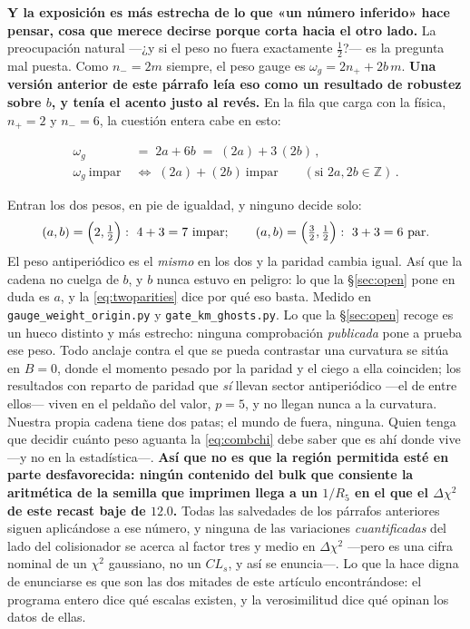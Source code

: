 \documentclass[11pt,a4paper]{article}
\newcommand{\ZZ}{\mathbb{Z}}
\newenvironment{keyeq}
  {\begin{center}\setlength{\fboxsep}{9pt}\setlength{\fboxrule}{0.8pt}%
   \begin{lrbox}{\keyeqbox}\begin{minipage}{0.88\textwidth}}
  {\end{minipage}\end{lrbox}%
   \fcolorbox{hdrblue!55}{hdrblue!6}{\usebox{\keyeqbox}}\end{center}}
\begin{document}
\noindent \textbf{Y la exposición es más estrecha de lo que «un número inferido» hace pensar, cosa
que merece decirse porque corta hacia el otro lado.} La preocupación natural ---¿y si el peso no
fuera exactamente $\tfrac12$?--- es la pregunta mal puesta. Como $n_-=2m$ siempre, el peso gauge es
$\omega_g=2n_++2b\,m$. \textbf{Una versión anterior de este párrafo leía eso como un resultado de
robustez sobre $b$, y tenía el acento justo al revés.} En la fila que carga con la física, $n_+=2$
y $n_-=6$, la cuestión entera cabe en esto:
\begin{keyeq}
\begin{equation}\label{eq:twoparities}
  \begin{aligned}
    \omega_g\;&=\;2a+6b\;=\;(2a)+3\,(2b)\,,\\[2pt]
    \omega_g\ \text{impar}\;&\iff\;(2a)+(2b)\ \text{impar}\qquad(\text{si }2a,2b\in\ZZ)\,.
  \end{aligned}
\end{equation}
\end{keyeq}
\noindent Entran los dos pesos, en pie de igualdad, y ninguno decide solo:
\[
  (a,b)=\Bigl(2,\tfrac12\Bigr):\ 4+3=7\ \text{impar};\qquad
  (a,b)=\Bigl(\tfrac32,\tfrac12\Bigr):\ 3+3=6\ \text{par}.
\]
El peso antiperiódico es el \emph{mismo} en los dos y la paridad cambia igual. Así que la cadena no
cuelga de $b$, y $b$ nunca estuvo en peligro: lo que la \S\ref{sec:open} pone en duda es $a$, y la
\eqref{eq:twoparities} dice por qué eso basta. Medido en
\texttt{gauge\_\allowbreak weight\_\allowbreak origin.py} y
\texttt{gate\_\allowbreak km\_\allowbreak ghosts.py}. Lo que la \S\ref{sec:open} recoge es un hueco distinto y más estrecho: ninguna
comprobación \emph{publicada} pone a prueba ese peso. Todo anclaje contra el que se pueda
contrastar una curvatura se sitúa en $B=0$, donde el momento pesado por la paridad y el ciego a
ella coinciden; los resultados con reparto de paridad que \emph{sí} llevan sector antiperiódico
---el de \cite{CCD24} entre ellos--- viven en el peldaño del valor, $p=5$, y no llegan nunca a la
curvatura. Nuestra propia cadena
tiene dos patas; el mundo de fuera, ninguna. Quien tenga que decidir cuánto peso aguanta la
\eqref{eq:combchi} debe saber que es ahí donde vive ---y no en la estadística---. \textbf{Así que no es que la región permitida esté en parte
desfavorecida: ningún contenido del bulk que consiente la aritmética de la semilla que
\cite{KM25} imprimen llega a un $1/R_5$ en el que el $\Delta\chi^2$ de este recast baje de
$12.0$.} Todas las salvedades de los párrafos anteriores
siguen aplicándose a ese número, y ninguna de las variaciones \emph{cuantificadas} del lado del
colisionador se acerca al factor tres y
medio en $\Delta\chi^2$ ---pero es una cifra nominal de un $\chi^2$ gaussiano, no un $CL_s$, y así
se enuncia---. Lo que la hace digna de enunciarse es que son las dos mitades de este artículo
encontrándose: el programa entero dice qué escalas existen, y la verosimilitud dice qué opinan los
datos de ellas.
\end{document}
